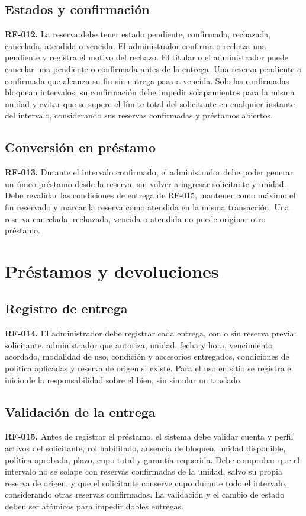 \subsection{Estados y confirmaci\'on}
\textbf{RF-012.} La reserva debe tener estado pendiente, confirmada, rechazada, cancelada, atendida o vencida. El administrador confirma o rechaza una pendiente y registra el motivo del rechazo. El titular o el administrador puede cancelar una pendiente o confirmada antes de la entrega. Una reserva pendiente o confirmada que alcanza su fin sin entrega pasa a vencida. Solo las confirmadas bloquean intervalos; su confirmaci\'on debe impedir solapamientos para la misma unidad y evitar que se supere el l\'imite total del solicitante en cualquier instante del intervalo, considerando sus reservas confirmadas y pr\'estamos abiertos.

\subsection{Conversi\'on en pr\'estamo}
\textbf{RF-013.} Durante el intervalo confirmado, el administrador debe poder generar un \'unico pr\'estamo desde la reserva, sin volver a ingresar solicitante y unidad. Debe revalidar las condiciones de entrega de RF-015, mantener como m\'aximo el fin reservado y marcar la reserva como atendida en la misma transacci\'on. Una reserva cancelada, rechazada, vencida o atendida no puede originar otro pr\'estamo.

\section{Pr\'estamos y devoluciones}

\subsection{Registro de entrega}
\textbf{RF-014.} El administrador debe registrar cada entrega, con o sin reserva previa: solicitante, administrador que autoriza, unidad, fecha y hora, vencimiento acordado, modalidad de uso, condici\'on y accesorios entregados, condiciones de pol\'itica aplicadas y reserva de origen si existe. Para el uso en sitio se registra el inicio de la responsabilidad sobre el bien, sin simular un traslado.

\subsection{Validaci\'on de la entrega}
\textbf{RF-015.} Antes de registrar el pr\'estamo, el sistema debe validar cuenta y perfil activos del solicitante, rol habilitado, ausencia de bloqueo, unidad disponible, pol\'itica aprobada, plazo, cupo total y garant\'ia requerida. Debe comprobar que el intervalo no se solape con reservas confirmadas de la unidad, salvo su propia reserva de origen, y que el solicitante conserve cupo durante todo el intervalo, considerando otras reservas confirmadas. La validaci\'on y el cambio de estado deben ser at\'omicos para impedir dobles entregas.

